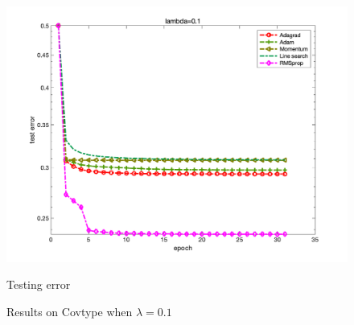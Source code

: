 \documentclass{article}
\begin{document}
\begin{figure}[H]
\begin{minipage}{0.33\linewidth}
		\includegraphics[width=1\linewidth]{./fig/err_c3}
		\caption{Testing error}
	\end{minipage}
	\caption*{Results on Covtype when $\lambda=0.1$}
\end{figure}
\end{document}

